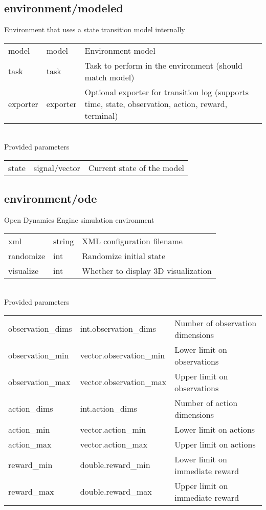 \subsection{environment/modeled}
\noindent Environment that uses a state transition model internally\\

\noindent\begin{tabular}{@{}lll@{}}
model&model&Environment model\\
task&task&Task to perform in the environment (should match model)\\
exporter&exporter&Optional exporter for transition log (supports time, state, observation, action, reward, terminal)\\
\end{tabular}
\\

\noindent Provided parameters\\

\noindent\begin{tabular}{@{}lll@{}}
state&signal/vector&Current state of the model\\
\end{tabular}
\subsection{environment/ode}
\noindent Open Dynamics Engine simulation environment\\

\noindent\begin{tabular}{@{}lll@{}}
xml&string&XML configuration filename\\
randomize&int&Randomize initial state\\
visualize&int&Whether to display 3D visualization\\
\end{tabular}
\\

\noindent Provided parameters\\

\noindent\begin{tabular}{@{}lll@{}}
observation\_dims&int.observation\_dims&Number of observation dimensions\\
observation\_min&vector.observation\_min&Lower limit on observations\\
observation\_max&vector.observation\_max&Upper limit on observations\\
action\_dims&int.action\_dims&Number of action dimensions\\
action\_min&vector.action\_min&Lower limit on actions\\
action\_max&vector.action\_max&Upper limit on actions\\
reward\_min&double.reward\_min&Lower limit on immediate reward\\
reward\_max&double.reward\_max&Upper limit on immediate reward\\
\end{tabular}
